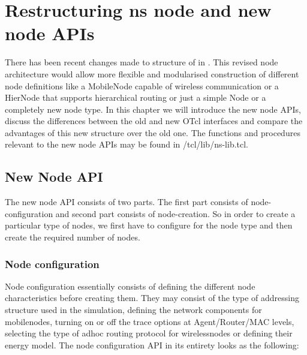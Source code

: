 \chapter{Restructuring ns node and new node APIs}
\label{chap:newnode}

There has been recent changes made to structure of 
 in \ns. This revised node architecture would
allow more flexible and modularised construction of different node
definitions like a MobileNode capable of wireless communication or a
HierNode that supports hierarchical routing or just a simple Node or a 
completely new node type. In this chapter we will introduce the new node
APIs, discuss the differences between the old and new
OTcl interfaces and compare the advantages of this new structure over the
old one. The functions and procedures relevant to the new node APIs may be
found in \ns/tcl/lib/ns-lib.tcl.

\section{New Node API}
\label{sec:newnode-API}

The new node API consists of two parts. The first part consists of
node-configuration and second part consists of node-creation. So in order
to create a particular type of nodes, we first have to configure for the 
node type and then create the required number of nodes.

\subsection{Node configuration}
\label{sec:nodeconfig}

Node configuration essentially consists of defining the different node
characteristics before creating them. They may consist of the type of
addressing structure used in the simulation, defining the network
components for mobilenodes, turning on or off the trace options at
Agent/Router/MAC levels, selecting the type of adhoc routing protocol for
wirelessnodes or defining their energy model.
The node configuration API in its entirety looks as the following:

